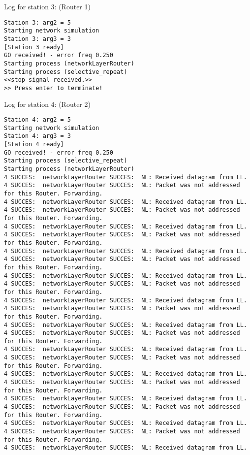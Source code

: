 Log for station 3: (Router 1)
\begin{lstlisting}[breaklines=true]
Station 3: arg2 = 5
Starting network simulation
Station 3: arg3 = 3
[Station 3 ready]
GO received! - error freq 0.250
Starting process (networkLayerRouter)
Starting process (selective_repeat)
<<stop-signal received.>>
>> Press enter to terminate!
\end{lstlisting}

Log for station 4: (Router 2)
\begin{lstlisting}[breaklines=true]
Station 4: arg2 = 5
Starting network simulation
Station 4: arg3 = 3
[Station 4 ready]
GO received! - error freq 0.250
Starting process (selective_repeat)
Starting process (networkLayerRouter)
4 SUCCES:  networkLayerRouter SUCCES:  NL: Received datagram from LL.
4 SUCCES:  networkLayerRouter SUCCES:  NL: Packet was not addressed for this Router. Forwarding.
4 SUCCES:  networkLayerRouter SUCCES:  NL: Received datagram from LL.
4 SUCCES:  networkLayerRouter SUCCES:  NL: Packet was not addressed for this Router. Forwarding.
4 SUCCES:  networkLayerRouter SUCCES:  NL: Received datagram from LL.
4 SUCCES:  networkLayerRouter SUCCES:  NL: Packet was not addressed for this Router. Forwarding.
4 SUCCES:  networkLayerRouter SUCCES:  NL: Received datagram from LL.
4 SUCCES:  networkLayerRouter SUCCES:  NL: Packet was not addressed for this Router. Forwarding.
4 SUCCES:  networkLayerRouter SUCCES:  NL: Received datagram from LL.
4 SUCCES:  networkLayerRouter SUCCES:  NL: Packet was not addressed for this Router. Forwarding.
4 SUCCES:  networkLayerRouter SUCCES:  NL: Received datagram from LL.
4 SUCCES:  networkLayerRouter SUCCES:  NL: Packet was not addressed for this Router. Forwarding.
4 SUCCES:  networkLayerRouter SUCCES:  NL: Received datagram from LL.
4 SUCCES:  networkLayerRouter SUCCES:  NL: Packet was not addressed for this Router. Forwarding.
4 SUCCES:  networkLayerRouter SUCCES:  NL: Received datagram from LL.
4 SUCCES:  networkLayerRouter SUCCES:  NL: Packet was not addressed for this Router. Forwarding.
4 SUCCES:  networkLayerRouter SUCCES:  NL: Received datagram from LL.
4 SUCCES:  networkLayerRouter SUCCES:  NL: Packet was not addressed for this Router. Forwarding.
4 SUCCES:  networkLayerRouter SUCCES:  NL: Received datagram from LL.
4 SUCCES:  networkLayerRouter SUCCES:  NL: Packet was not addressed for this Router. Forwarding.
4 SUCCES:  networkLayerRouter SUCCES:  NL: Received datagram from LL.
4 SUCCES:  networkLayerRouter SUCCES:  NL: Packet was not addressed for this Router. Forwarding.
4 SUCCES:  networkLayerRouter SUCCES:  NL: Received datagram from LL.

\end{lstlisting}
